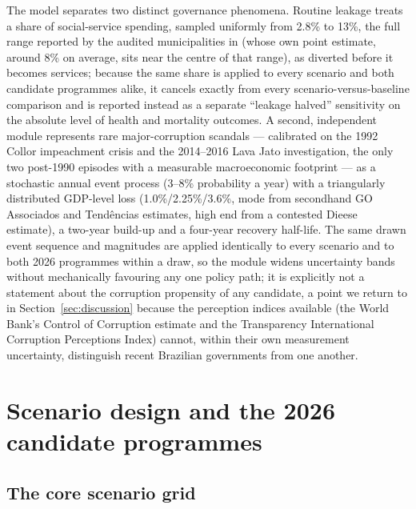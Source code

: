 \documentclass[11pt,a4paper]{article}
\begin{document}
The model separates two distinct governance phenomena. Routine leakage treats a share of social-service spending, sampled uniformly from 2.8\% to 13\%, the full range reported by the audited municipalities in \citet{ferrazfinanmoreira2012} (whose own point estimate, around 8\% on average, sits near the centre of that range), as diverted before it becomes services; because the same share is applied to every scenario and both candidate programmes alike, it cancels exactly from every scenario-versus-baseline comparison and is reported instead as a separate ``leakage halved'' sensitivity on the absolute level of health and mortality outcomes. A second, independent module represents rare major-corruption scandals --- calibrated on the 1992 Collor impeachment crisis and the 2014--2016 Lava Jato investigation, the only two post-1990 episodes with a measurable macroeconomic footprint --- as a stochastic annual event process (3--8\% probability a year) with a triangularly distributed GDP-level loss (1.0\%/2.25\%/3.6\%, mode from secondhand GO Associados and Tend\^encias estimates, high end from a contested Dieese estimate), a two-year build-up and a four-year recovery half-life. The same drawn event sequence and magnitudes are applied identically to every scenario and to both 2026 programmes within a draw, so the module widens uncertainty bands without mechanically favouring any one policy path; it is explicitly not a statement about the corruption propensity of any candidate, a point we return to in Section~\ref{sec:discussion} because the perception indices available (the World Bank's Control of Corruption estimate and the Transparency International Corruption Perceptions Index) cannot, within their own measurement uncertainty, distinguish recent Brazilian governments from one another.

\section{Scenario design and the 2026 candidate programmes}
\label{sec:scenarios}

\subsection{The core scenario grid}
\end{document}
